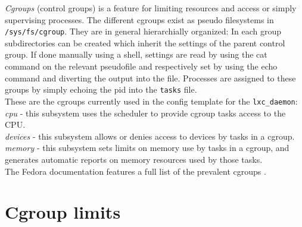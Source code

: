 \textit{Cgroups} (control groups) is a feature for limiting resources and access or simply supervising processes. The different cgroups exist as
pseudo filesystems in \texttt{/sys/fs/cgroup}. They are in general hierarchially organized: In each group subdirectories can be created
which inherit the settings of the parent control group. If done manually using a shell, settings are read by using the cat command on the relevant
pseudofile and respectively set by using the echo command and diverting the output into the file. Processes are assigned to these groups
by simply echoing the pid into the \texttt{tasks} file.\\
These are the cgroups currently used in the config template for the \texttt{lxc\_daemon}:\\
\textit{cpu} - this subsystem uses the scheduler to provide cgroup tasks access to the CPU.\\
\textit{devices} - this subsystem allows or denies access to devices by tasks in a cgroup. \\
\textit{memory} - this subsystem sets limits on memory use by tasks in a cgroup, and generates automatic reports on memory resources used by those tasks.\\
The Fedora documentation features a full list of the prevalent cgroups \cite{cgroups}.

\section{Cgroup limits}

